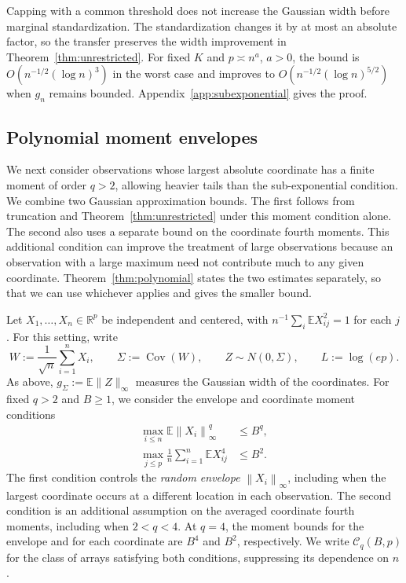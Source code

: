 \documentclass[11pt,letterpaper,twoside,leqno]{article}
\theoremstyle{bookplain}
\theoremstyle{bookremark}
\newcommand{\E}{\mathbb E}
\newcommand{\R}{\mathbb R}
\newcommand{\Cov}{\operatorname{Cov}}
\newcommand{\norm}[1]{\left\lVert#1\right\rVert}
\begin{document}
{
{
Capping with a common threshold does not increase the Gaussian
width before marginal standardization. The standardization changes
it by at most an absolute factor, so the transfer preserves the
width improvement in Theorem~\ref{thm:unrestricted}.
For fixed \(K\) and \(p\asymp n^a\), \(a>0\), the bound is
\(O(n^{-1/2}(\log n)^3)\) in the worst case and improves to
\(O(n^{-1/2}(\log n)^{5/2})\) when \(g_n\) remains bounded.
Appendix~\ref{app:subexponential} gives the proof.
}
}

\subsection{Polynomial moment envelopes}\label{sec:polynomial-main}

{
We next consider observations whose largest absolute coordinate has a
finite moment of order \(q>2\), allowing heavier tails than the
sub-exponential condition. We combine two Gaussian approximation
bounds. The first follows from truncation and
Theorem~\ref{thm:unrestricted} under this moment condition alone. The
second also uses a separate bound on the coordinate fourth moments.
This additional condition can improve the treatment of large
observations because an observation with a large maximum need not
contribute much to any given coordinate.
Theorem~\ref{thm:polynomial} states the two estimates separately,
so that we can use whichever applies and gives the smaller bound.
}

Let \(X_1,\ldots,X_n\in\R^p\) be independent and centered, with
\(n^{-1}\sum_i\E X_{ij}^2=1\) for each \(j\). For this setting, write
\begin{equation}
 W:=\frac1{\sqrt n}\sum_{i=1}^nX_i,\qquad
 \Sigma:=\Cov(W),\qquad Z\sim N(0,\Sigma),\qquad L:=\log(ep).
 \label{poly:setup}
\end{equation}
{As above, \(g_\Sigma:=\E\|Z\|_\infty\) measures the Gaussian
width of the coordinates.}
{
For fixed \(q>2\) and \(B\ge1\), we consider the envelope and
coordinate moment conditions
\begin{align}
 \max_{i\le n}\E\norm{X_i}_\infty^q&\le B^q,
 \label{poly:envelope}\\
 \max_{j\le p}\frac1n\sum_{i=1}^n\E X_{ij}^4&\le B^2.
 \label{poly:fourth}
\end{align}
The first condition controls the \emph{random envelope}
\(\norm{X_i}_\infty\), including when the largest coordinate occurs
at a different location in each observation. The second condition is
an additional assumption on the averaged coordinate fourth moments,
including when \(2<q<4\). At \(q=4\), the moment bounds for
the envelope and for each coordinate are \(B^4\) and \(B^2\),
respectively. We write \(\mathcal C_q(B,p)\) for the class of arrays
satisfying both conditions, suppressing its dependence on \(n\).
}
\end{document}
